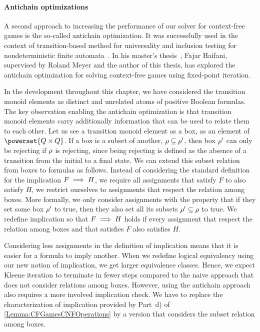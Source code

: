 \documentclass[../../diss.tex]{subfiles}
\begin{document}
\paragraph{Antichain optimizations}

A second approach to increasing the performance of our solver for context-free games is the so-called antichain optimization.
It was successfully used in the context of transition-based method for universality and inclusion testing for nondeterministic finite automata~\cite{DeWulfDHR06,AbdullaCHMV10}.
In his master's thesis~\cite{Haifani17}, Fajar Haifani, supervised by Roland Meyer and the author of this thesis, has explored the antichain optimization for solving context-free games using fixed-point iteration.

In the development throughout this chapter, we have considered the transition monoid elements as distinct and unrelated atoms of positive Boolean formulas.
The key observation enabling the antichain optimization is that transition monoid elements carry additionally information that can be used to relate them to each other.
Let us see a transition monoid element as a box, \ie as an element of $\powerset{Q \times Q}$.
If a box is a subset of another, $\tbox \subseteq \tbox'$, then box $\tbox'$ can only be rejecting if $\tbox$ is rejecting, since being rejecting is defined as the absence of a transition from the initial to a final state.
We can extend this subset relation from boxes to formulas as follows.
Instead of considering the standard definition for the implication $F \implies H$, \ie we require all assignments that satisfy $F$ to also satisfy $H$, we restrict ourselves to assignments that respect the relation among boxes.
More formally, we only consider assignments with the property that if they set some box $\tbox'$ to true, then they also set all its subsets $\tbox' \subseteq \tbox$ to true.
We redefine implication so that $F \implies H$ holds if every assignment that respect the relation among boxes and that satisfies $F$ also satisfies $H$.

Considering less assignments in the definition of implication means that it is easier for a formula to imply another.
When we redefine logical equivalency using our new notion of implication, we get larger equivalence classes.
Hence, we expect Kleene iteration to terminate in fewer steps compared to the naive approach that does not consider relations among boxes.
However, using the antichain approach also requires a more involved implication check.
We have to replace the characterization of implication provided by Part~d) of \cref{Lemma:CFGamesCNFOperations} by a version that considers the subset relation among boxes.
\end{document}
